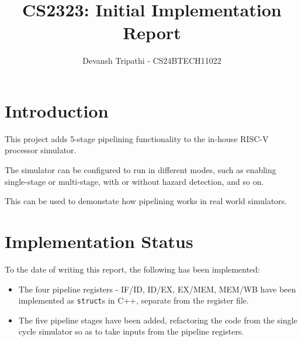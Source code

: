 \documentclass{report}
\title{CS2323: Initial Implementation Report}
\author{Devansh Tripathi - CS24BTECH11022}
\date{}
\begin{document}
\maketitle
\newpage

\tableofcontents
\newpage

\section{Introduction}
This project adds 5-stage pipelining functionality to the in-house RISC-V processor simulator.

The simulator can be configured to run in different modes, such as enabling single-stage or multi-stage, with or without hazard detection, and so on.

This can be used to demonstate how pipelining works in real world simulators.

\section{Implementation Status}
To the date of writing this report, the following has been implemented:
\begin{itemize}
    \item The four pipeline registers - IF/ID, ID/EX, EX/MEM, MEM/WB have been implemented as \texttt{struct}s in C++, separate from the register file.
    \item The five pipeline stages have been added, refactoring the code from the single cycle simulator so as to take inputs from the pipeline registers.
\end{itemize}
\end{document}
